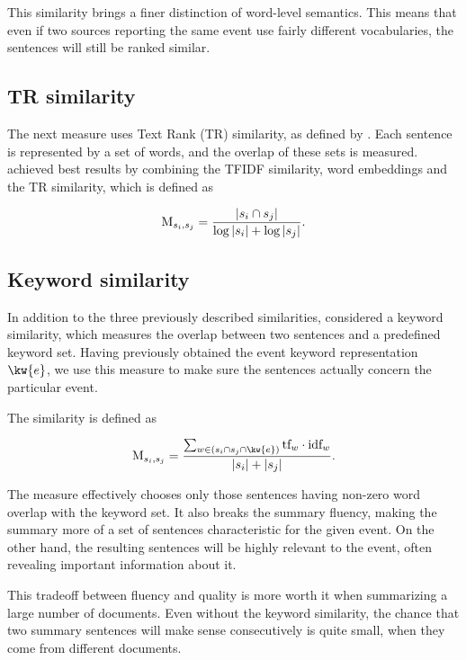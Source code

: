 This similarity brings a finer distinction of word-level semantics. This means that even if two sources reporting the same event use fairly different vocabularies, the sentences will still be ranked similar.

\subsection{TR similarity}

The next measure uses Text Rank (TR) similarity, as defined by \cite{textrank}. Each sentence is represented by a set of words, and the overlap of these sets is measured. \cite{mogren-2} achieved best results by combining the TFIDF similarity, word embeddings and the TR similarity, which is defined as

\begin{equation}
	\text{M}_{s_{i}, s_{j}} = \frac{\left| s_{i} \cap s_{j} \right|}{\log{\left| s_{i} \right|} + \log{\left| s_{j} \right|}}.
\end{equation}


\subsection{Keyword similarity}

In addition to the three previously described similarities, \cite{mogren-2} considered a keyword similarity, which measures the overlap between two sentences and a predefined keyword set. Having previously obtained the event keyword representation $\kw{e}$, we use this measure to make sure the sentences actually concern the particular event.

The similarity is defined as 

\begin{equation}
	\similarity_{s_{i}, s_{j}} = \frac{\sum_{w \in \left( s_{i} \cap s_{j} \cap \kw{e} \right)} \text{tf}_{w} \cdot \text{idf}_{w}}{\left| s_{i} \right| + \left| s_{j} \right|}.
\end{equation}

The measure effectively chooses only those sentences having non-zero word overlap with the keyword set. It also breaks the summary fluency, making the summary more of a set of sentences characteristic for the given event. On the other hand, the resulting sentences will be highly relevant to the event, often revealing important information about it.

This tradeoff between fluency and quality is more worth it when summarizing a large number of documents. Even without the keyword similarity, the chance that two summary sentences will make sense consecutively is quite small, when they come from different documents.


